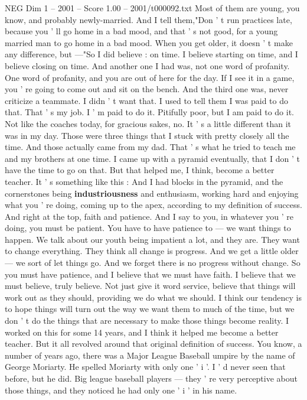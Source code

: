 \begin{textsample}{NEG Dim 1 – 2001 – Score 1.00 – 2001/t000092.txt}
Most of them are young, you know, and probably newly-married.
And I tell them,"Don ' t run practices late, because you ' ll go home in a bad mood, and that ' s not good, for a young married man to go home in a bad mood.
When you get older, it doesn ' t make any difference, but —"So I did believe : on time.
I believe starting on time, and I believe closing on time.
And another one I had was, not one word of profanity.
One word of profanity, and you are out of here for the day.
If I see it in a game, you ' re going to come out and sit on the bench.
And the third one was, never criticize a teammate.
I didn ' t want that.
I used to tell them I was paid to do that.
That ' s my job.
I ' m paid to do it.
Pitifully poor, but I am paid to do it.
Not like the coaches today, for gracious sakes, no.
It ' s a little different than it was in my day.
Those were three things that I stuck with pretty closely all the time.
And those actually came from my dad.
That ' s what he tried to teach me and my brothers at one time.
I came up with a pyramid eventually, that I don ' t have the time to go on that.
But that helped me, I think, become a better teacher.
It ' s something like this : And I had blocks in the pyramid, and the cornerstones being \textbf{industriousness} and enthusiasm, working hard and enjoying what you ' re doing, coming up to the apex, according to my definition of success.
And right at the top, faith and patience.
And I say to you, in whatever you ' re doing, you must be patient.
You have to have patience to — we want things to happen.
We talk about our youth being impatient a lot, and they are.
They want to change everything.
They think all change is progress.
And we get a little older — we sort of let things go.
And we forget there is no progress without change.
So you must have patience, and I believe that we must have faith.
I believe that we must believe, truly believe.
Not just give it word service, believe that things will work out as they should, providing we do what we should.
I think our tendency is to hope things will turn out the way we want them to much of the time, but we don ' t do the things that are necessary to make those things become reality.
I worked on this for some 14 years, and I think it helped me become a better teacher.
But it all revolved around that original definition of success.
You know, a number of years ago, there was a Major League Baseball umpire by the name of George Moriarty.
He spelled Moriarty with only one ' i '.
I ' d never seen that before, but he did.
Big league baseball players — they ' re very perceptive about those things, and they noticed he had only one ' i ' in his name.

\end{textsample}
